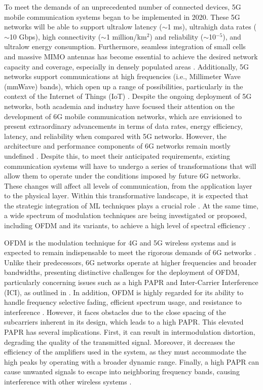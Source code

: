 \documentclass[conference]{IEEEtran}
\begin{document}
To meet the demands of an unprecedented number of connected devices, 5G mobile communication systems began to be implemented in 2020. These 5G networks will be able to support ultralow latency ($\sim$1 ms), ultrahigh data rates ($\sim$10 Gbps), high connectivity ($\sim$1 million/km$^2$) and reliability ($\sim$10$^{-5}$), and ultralow energy consumption. Furthermore, seamless integration of small cells and massive MIMO antennas has become essential to achieve the desired network capacity and coverage, especially in densely populated areas \cite{b29, b30, b31}. Additionally, 5G networks support communications at high frequencies (i.e., Millimeter Wave (mmWave) bands), which open up a range of possibilities, particularly in the context of the Internet of Things (IoT) \cite{b32}. Despite the ongoing deployment of 5G networks, both academia and industry have focused their attention on the development of 6G mobile communication networks, which are envisioned to present extraordinary advancements in terms of data rates, energy efficiency, latency, and reliability when compared with 5G networks. However, the architecture and performance components of 6G networks remain mostly undefined \cite{b33, b34}. Despite this, to meet their anticipated requirements, existing communication systems will have to undergo a series of transformations that will allow them to operate under the conditions imposed by future 6G networks. These changes will affect all levels of communication, from the application layer to the physical layer. Within this transformative landscape, it is expected that the strategic integration of ML techniques plays a crucial role \cite{b35, b36}. At the same time, a wide spectrum of modulation techniques are being investigated or proposed, including OFDM and its variants, to achieve a high level of spectral efficiency \cite{b37, b38, b39, b40}.

OFDM is the modulation technique for 4G and 5G wireless systems and is expected to remain indispensable to meet the rigorous demands of 6G networks \cite{b41, b42, b43}. Unlike their predecessors, 6G networks operate at higher frequencies and broader bandwidths, presenting distinctive challenges for the deployment of OFDM, particularly concerning issues such as a high PAPR and Inter-Carrier Interference (ICI), as outlined in \cite{b44}. In addition, OFDM is highly regarded for its ability to handle frequency selective fading, efficient spectrum usage, and resistance to interference \cite{b45}. However, it faces obstacles due to the close spacing of the subcarriers inherent in its design, which leads to a high PAPR. This elevated PAPR has several implications. First, it can result in intermodulation distortion, degrading the quality of the transmitted signal. Moreover, it decreases the efficiency of the amplifiers used in the system, as they must accommodate the high peaks by operating with a broader dynamic range. Finally, a high PAPR can cause unwanted signals to escape into neighboring frequency bands, causing interference with other wireless systems \cite{b46, b47}.
\end{document}
